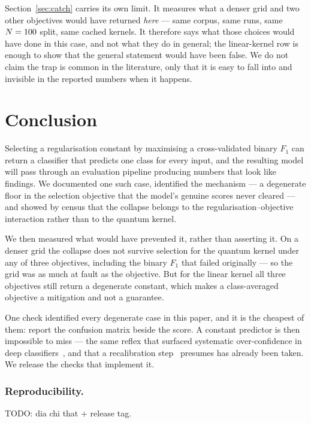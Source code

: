 \documentclass[runningheads]{llncs}
\newif\ifanonymous
\newcommand{\Fone}{F_1}
\begin{document}
Section~\ref{sec:catch} carries its own limit. It measures what a denser
grid and two other objectives would have returned \emph{here} --- same
corpus, same \pcurveRuns{} runs, same $N = 100$ split, same cached
kernels. It therefore says what those choices would have done in this case,
and not what they do in general; the linear-kernel row is enough to show
that the general statement would have been false. We do not claim the trap
is common in the literature, only that it is easy to fall into and invisible
in the reported numbers when it happens.

\section{Conclusion}\label{sec:conclusion}

Selecting a regularisation constant by maximising a cross-validated binary
$\Fone$ can return a classifier that predicts one class for every input, and
the resulting model will pass through an evaluation pipeline producing
numbers that look like findings. We documented one such case, identified the
mechanism --- a degenerate floor in the selection objective that the model's
genuine scores never cleared --- and showed by census that the collapse
belongs to the regularisation--objective interaction rather than to the
quantum kernel.

We then measured what would have prevented it, rather than asserting it. On
a denser grid the collapse does not survive selection for the quantum kernel
under any of three objectives, including the binary $\Fone$ that failed
originally --- so the grid was as much at fault as the objective. But for
the linear kernel all three objectives still return a degenerate constant,
which makes a class-averaged objective a mitigation and not a guarantee.

One check identified every degenerate case in this paper, and it is the
cheapest of them: report the confusion matrix beside the score. A constant
predictor is then impossible to miss --- the same reflex that surfaced
systematic over-confidence in deep classifiers~\cite{guo2017calibration},
and that a recalibration step~\cite{platt1999svm} presumes has already been
taken. We release the checks that implement it.

\subsubsection*{Reproducibility.}
\ifanonymous
  All artifacts, figure scripts and audit checks are available at an anonymous
  mirror: \url{https://anonymous.4open.science/r/selection-objective-artifacts-A54F}.
\else
  TODO: dia chi that + release tag.
\fi
\end{document}
